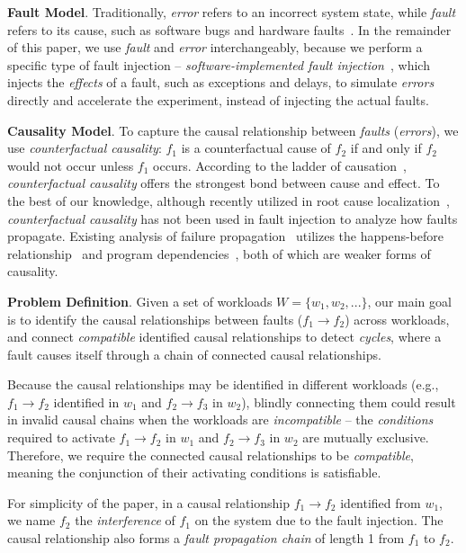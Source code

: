\textbf{Fault Model}. 
Traditionally, 
\textit{error} refers to an incorrect system state, 
while \textit{fault} refers to its cause, 
such as software bugs and hardware faults~\cite{natella2016assessing}. 
In the remainder of this paper, 
we use \textit{fault} and \textit{error} interchangeably, 
because we perform a specific type of fault injection 
-- \textit{software-implemented fault injection}~\cite{natella2016assessing}, 
which injects the \textit{effects} of a fault, 
such as exceptions and delays, to simulate \textit{errors} directly and accelerate the experiment, 
instead of injecting the actual faults. 

\textbf{Causality Model}. 
To capture the causal relationship between \textit{faults} (\textit{errors}), 
we use \textit{counterfactual causality}: 
$f_1$ is a counterfactual cause of $f_2$ if and only if $f_2$ would not occur unless $f_1$ occurs. 
According to the ladder of causation~\cite{pearl2018book}, 
\textit{counterfactual causality} offers 
the strongest bond between cause and effect. 
To the best of our knowledge, 
although recently utilized in root cause localization~\cite{fariha2020causality,johnson2020causal}, 
\textit{counterfactual causality} has not been used in fault injection 
to analyze how faults propagate. 
Existing analysis of failure propagation~\cite{li2018pcatch,li2024exchain} 
utilizes the happens-before relationship~\cite{li2018pcatch} 
and program dependencies~\cite{li2024exchain}, 
both of which are weaker forms of causality.  

\textbf{Problem Definition}. 
Given a set of workloads $W = \{w_1, w_2, ...\}$, 
our main goal is to identify the causal relationships between faults 
($f_1 \rightarrow f_2$) across workloads, 
and connect \textit{compatible} 
identified causal relationships 
to detect \textit{cycles}, 
where a fault causes itself through a chain of connected causal relationships.

Because the causal relationships may be identified 
in different workloads (e.g., $f_1 \rightarrow f_2$ identified in $w_1$ and $f_2 \rightarrow f_3$ in $w_2$), 
blindly connecting them could result in invalid causal chains 
when the workloads are \textit{incompatible} -- the \textit{conditions} required to activate $f_1 \rightarrow f_2$ in $w_1$ and $f_2 \rightarrow f_3$ in $w_2$ are mutually exclusive. 
Therefore, 
we require the connected causal relationships to be \textit{compatible}, 
meaning the conjunction of their activating conditions is satisfiable. 


For simplicity of the paper, in a causal relationship $f_1 \rightarrow f_2$ identified from $w_1$, we name $f_2$ the \textit{interference} of $f_1$ on the system due to the fault injection. The causal relationship also forms a \textit{fault propagation chain} of length 1 from $f_1$ to $f_2$.


